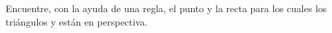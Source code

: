 \newpage
\begin{section-exercise}
    Encuentre, con la ayuda de una regla, el punto y la recta para los cuales los triángulos  y  están en perspectiva.

    \vspace*{\fill}
    \begin{figure}[H]
        \centering
        
    \end{figure}
    \vspace*{\fill}
\end{section-exercise}